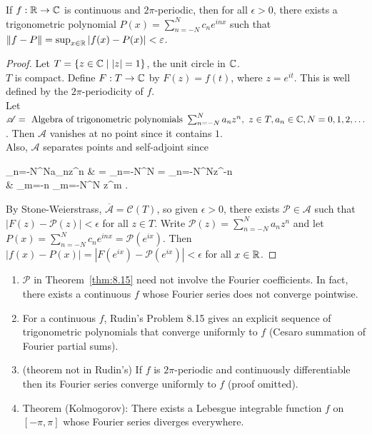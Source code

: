 \begin{thm}[15]
	If $f: \mathbb{R}\to \mathbb{C}$ is continuous and $2\pi$-periodic, then for all $\epsilon>0$, there exists a trigonometric polynomial $P(x)=\sum_{n=-N}^{N}{c_n e^{inx}}$ such that $\|f-P\|= \sup_{x \in \mathbb{R}} \left|f(x)-P(x)\right|<\varepsilon$.
	\begin{proof}
		Let $T=\{ z \in \mathbb{C} \mid \left|z\right|=1\}$, the unit circle in $\mathbb{C}$.\\
		$T$ is compact. Define $F: T\to \mathbb{C}$ by $F(z)=f(t)$, where $z=e^{it}$. This is well defined by the $2\pi$-periodicity of $f$.\\
		Let $\mathscr{A}=\text{ Algebra of trigonometric polynomials } \sum_{n=-N}^{N}{a_{n}z^{n}}, \,\, z \in T, a_{n} \in \mathbb{C}, N=0,1,2, \ldots $. Then $\mathscr{A}$ vanishes at no point since it contains $1$.\\
		Also, $\mathscr{A}$ separates points and self-adjoint since
		\begin{flalign*}
			\sum_{n=-N}^{N}{a_{n}z^{n}} & = \sum_{n=-N}^{N}{}      = \sum_{n=-N}^{N}{z^{-n}} \\
			                            & \underbrace{=}_{m=-n} \sum_{m=-N}^{N}{ z^{m}} \in {}
			.\end{flalign*}
		By Stone-Weierstrass, $\overline{\mathscr{A}}= \mathscr{C}(T)$, so given $\epsilon>0$, there exists $\mathscr{P} \in \mathscr{A}$ such that $\left|F(z)-\mathscr{P}(z)\right|<\epsilon$ for all $z \in T$.
		Write $\mathscr{P}(z)=\sum_{n=-N}^{N}{a_n z^{n}}$ and let $P(x)=\sum_{n=-N}^{N}{c_n e^{inx}}= \mathscr{P}(e^{ix})$.
		Then $\left|f(x)-P(x)\right|=\left|F(e^{ix})-\mathscr{P}(e^{ix})\right|<\epsilon$ for all $x \in \mathbb{R}$.
	\end{proof}
	\begin{remark}
		\begin{enumerate}
			\item $\mathscr{P}$ in Theorem~\ref{thm:8.15} need not involve the Fourier coefficients. In fact, there exists a continuous $f$ whose Fourier series does not converge pointwise.
			\item For a continuous $f$, Rudin's Problem 8.15 gives an explicit sequence of trigonometric polynomials that converge uniformly to $f$ (Cesaro summation of Fourier partial sums).
			\item (theorem not in Rudin's) If $f$ is $2\pi$-periodic and continuously differentiable then its Fourier series converge uniformly to $f$ (proof omitted).
			\item Theorem (Kolmogorov): There exists a Lebesgue integrable function $f$ on $[-\pi,\pi]$ whose Fourier series diverges everywhere.
		\end{enumerate}
	\end{remark}
\end{thm}


